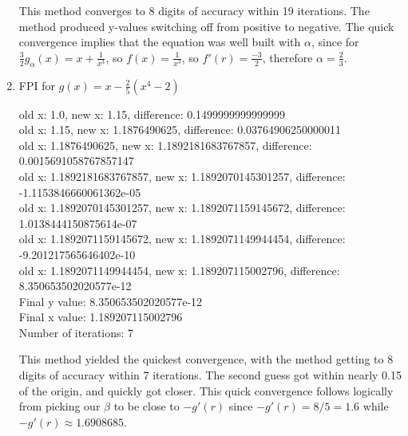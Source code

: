\documentclass[12pt]{article}
\begin{document}
\begin{enumerate}
This method converges to 8 digits of accuracy within 19 iterations.  The method produced y-values switching off from positive to negative.  The quick convergence implies that the equation was well built with $\alpha$, since for $\frac{3}{2}g_\alpha(x)=x+\frac{1}{x^3}$, so $f(x)=\frac{1}{x^3}$, so $f'(r)=\frac{-3}{2}$, therefore $\alpha=\frac{2}{3}$.

\pagebreak
\item FPI for $g(x)=x-\frac{2}{5}(x^4-2)$

\begin{footnotesize}
\begin{spacing}{-.8}
old x: 1.0, new x: 1.15, difference: 0.1499999999999999\\
old x: 1.15, new x: 1.1876490625, difference: 0.03764906250000011\\
old x: 1.1876490625, new x: 1.1892181683767857, difference: 0.0015691058767857147\\
old x: 1.1892181683767857, new x: 1.1892070145301257, difference: -1.1153846660061362e-05\\
old x: 1.1892070145301257, new x: 1.1892071159145672, difference: 1.0138444150875614e-07\\
old x: 1.1892071159145672, new x: 1.1892071149944454, difference: -9.201217565646402e-10\\
old x: 1.1892071149944454, new x: 1.189207115002796, difference: 8.350653502020577e-12\\
Final y value: 8.350653502020577e-12\\
Final x value: 1.189207115002796\\
Number of iterations: 7\\
\end{spacing}
\end{footnotesize}
\vspace{.4in}
This method yielded the quickest convergence, with the method getting to 8 digits of accuracy within 7 iterations.  The second guess got within nearly 0.15 of the origin, and quickly got closer.  This quick convergence follows logically from picking our $\beta$ to be close to $-g'(r)$ since $-g'(r) = 8/5 = 1.6$ while $-g'(r) \approx 1.6908685$.

\end{enumerate}

\pagebreak
\end{document}

